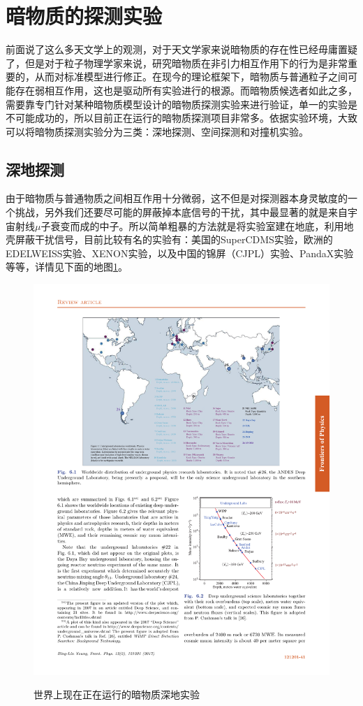 \documentclass{ctexart}
\begin{document}
	\section{暗物质的探测实验}
	前面说了这么多天文学上的观测，对于天文学家来说暗物质的存在性已经毋庸置疑了，但是对于粒子物理学家来说，研究暗物质在非引力相互作用下的行为是非常重要的，从而对标准模型进行修正。在现今的理论框架下，暗物质与普通粒子之间可能存在弱相互作用，这也是驱动所有实验进行的根源。而暗物质候选者如此之多，需要靠专门针对某种暗物质模型设计的暗物质探测实验来进行验证，单一的实验是不可能成功的，所以目前正在运行的暗物质探测项目非常多。依据实验环境，大致可以将暗物质探测实验分为三类：深地探测、空间探测和对撞机实验。
	
	\subsection{深地探测}
	由于暗物质与普通物质之间相互作用十分微弱，这不但是对探测器本身灵敏度的一个挑战，另外我们还要尽可能的屏蔽掉本底信号的干扰，其中最显著的就是来自宇宙射线$\mu$子衰变而成的中子。所以简单粗暴的方法就是将实验室建在地底，利用地壳屏蔽干扰信号，目前比较有名的实验有：美国的SuperCDMS实验，欧洲的EDELWEISS实验、XENON实验，以及中国的锦屏（CJPL）实验、PandaX实验等等，详情见下面的地图\ref{fig:7}。
	\begin{figure}[h]
		\centering
		\includegraphics[width=\linewidth]{figs/fig7.pdf}
		\label{fig:7}
		\caption{世界上现在正在运行的暗物质深地实验}
	\end{figure}
\end{document}
